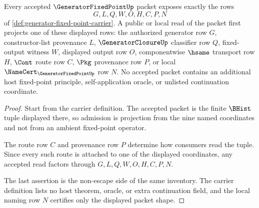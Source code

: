 \begin{theorem}
\label{thm:generator-fixed-point-admitted-packet-row}
Every accepted $\GeneratorFixedPointUp$ packet exposes exactly the rows
$$
G,L,Q,W,O,H,C,P,N
$$
of \autoref{def:generator-fixed-point-carrier}. A public or local read of the packet first projects one of these displayed rows: the authorized generator row $G$, constructor-list provenance $L$, $\GeneratorClosureUp$ classifier row $Q$, fixed-output witness $W$, displayed output row $O$, componentwise $\hsame$ transport row $H$, $\Cont$ route row $C$, $\Pkg$ provenance row $P$, or local $\NameCert_{\GeneratorFixedPointUp}$ row $N$. No accepted packet contains an additional host fixed-point principle, self-application oracle, or unlisted continuation coordinate.
\end{theorem}
\begin{proof}
Start from the carrier definition. The accepted packet is the finite $\BHist$ tuple displayed there, so admission is projection from the nine named coordinates and not from an ambient fixed-point operator.

The route row $C$ and provenance row $P$ determine how consumers read the tuple. Since every such route is attached to one of the displayed coordinates, any accepted read factors through $G,L,Q,W,O,H,C,P,N$.

The last assertion is the non-escape side of the same inventory. The carrier definition lists no host theorem, oracle, or extra continuation field, and the local naming row $N$ certifies only the displayed packet shape.
\end{proof}

